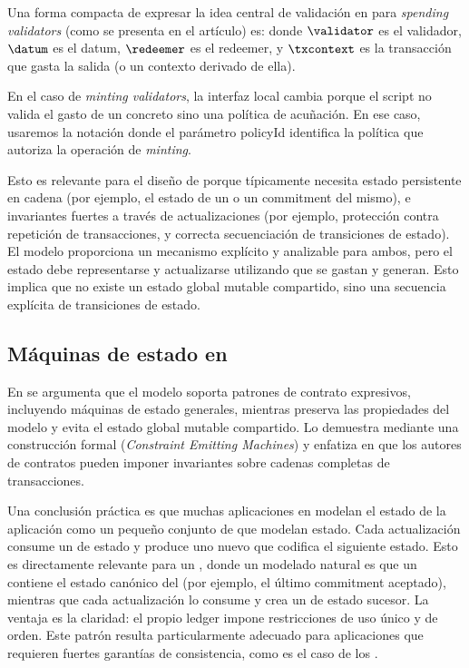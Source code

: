 Una forma compacta de expresar la idea central de validación en \eUTxO para \textit{spending validators} (como se presenta en el artículo) es: \SpendValidatorSchema donde $\validator$ es el validador, $\datum$ es el datum, $\redeemer$ es el redeemer, y $\txcontext$ es la transacción que gasta la salida (o un contexto derivado de ella).

En el caso de \textit{minting validators}, la interfaz local cambia porque el script no valida el gasto de un \UTxO concreto sino una política de acuñación. En ese caso, usaremos la notación \MintValidatorSchema donde el parámetro \textsf{policyId} identifica la política que autoriza la operación de \textit{minting}.

Esto es relevante para el diseño de \zkBridge porque típicamente necesita estado persistente en cadena (por ejemplo, el estado de un \LightClient o un commitment del mismo), e invariantes fuertes a través de actualizaciones (por ejemplo, protección contra repetición de transacciones, y correcta secuenciación de transiciones de estado). El modelo \eUTxO proporciona un mecanismo explícito y analizable para ambos, pero el estado debe representarse y actualizarse utilizando \UTxOs que se gastan y generan. Esto implica que no existe un estado global mutable compartido, sino una secuencia explícita de transiciones de estado.

\subsection{Máquinas de estado en \eUTxO}

En \cite{Chakravarty2020} se argumenta que el modelo soporta patrones de contrato expresivos, incluyendo máquinas de estado generales, mientras preserva las propiedades del modelo \UTxO y evita el estado global mutable compartido. Lo demuestra mediante una construcción formal (\emph{Constraint Emitting Machines}) y enfatiza en que los autores de contratos pueden imponer invariantes sobre cadenas completas de transacciones.

Una conclusión práctica es que muchas aplicaciones en \Cardano modelan el estado de la aplicación como un pequeño conjunto de \UTxOs que modelan estado. Cada actualización consume un \UTxO de estado y produce uno nuevo que codifica el siguiente estado. Esto es directamente relevante para un \zkBridge, donde un modelado natural es que un \UTxO contiene el estado canónico del \Bridge (por ejemplo, el último commitment aceptado), mientras que cada actualización lo consume y crea un \UTxO de estado sucesor. La ventaja es la claridad: el propio ledger impone restricciones de uso único y de orden. Este patrón resulta particularmente adecuado para aplicaciones que requieren fuertes garantías de consistencia, como es el caso de los \Bridges.

